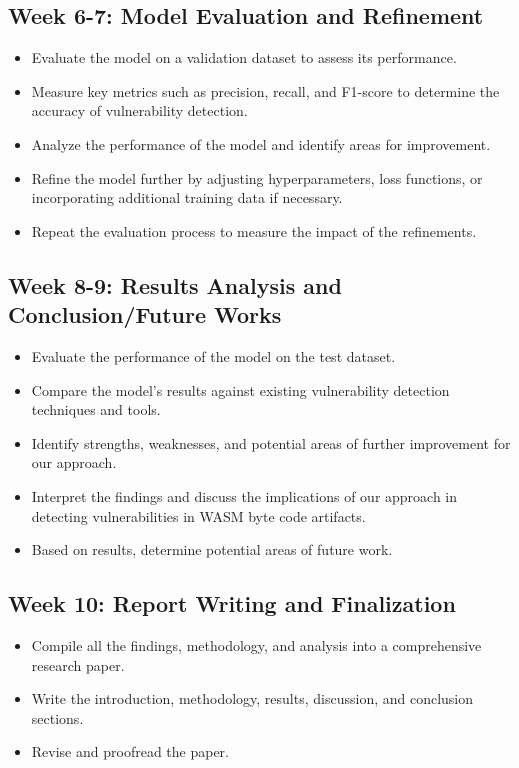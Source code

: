 \documentclass{article}
\begin{document}
\subsection{Week 6-7: Model Evaluation and Refinement}
\begin{itemize}
\item Evaluate the model on a validation dataset to assess its performance. 
\item Measure key metrics such as precision, recall, and F1-score to determine the accuracy of vulnerability detection. 
\item Analyze the performance of the model and identify areas for improvement. 
\item Refine the model further by adjusting hyperparameters, loss functions, or incorporating additional training data if necessary. 
\item Repeat the evaluation process to measure the impact of the refinements. 
\end{itemize}

\subsection{Week 8-9: Results Analysis and Conclusion/Future Works}
\begin{itemize}
\item Evaluate the performance of the model on the test dataset. 
\item Compare the model's results against existing vulnerability detection techniques and tools. 
\item Identify strengths, weaknesses, and potential areas of further improvement for our approach. 
\item Interpret the findings and discuss the implications of our approach in detecting vulnerabilities in WASM byte code artifacts. 
\item Based on results, determine potential areas of future work. 
\end{itemize}

\subsection{Week 10: Report Writing and Finalization}
\begin{itemize}
\item Compile all the findings, methodology, and analysis into a comprehensive research paper. 
\item Write the introduction, methodology, results, discussion, and conclusion sections. 
\item Revise and proofread the paper. 
\end{itemize}


\nocite{Eth2Vec}
\nocite{DNNForJS}
\nocite{SmartContracts}
\nocite{NueralModel}
\nocite{MethodCrash}
\nocite{TokenizingCode}
\nocite{BigVocabNot}
\nocite{Attention}
\nocite{OpenAIWhisper}
\nocite{BERTWebShell}



 
\end{document}
